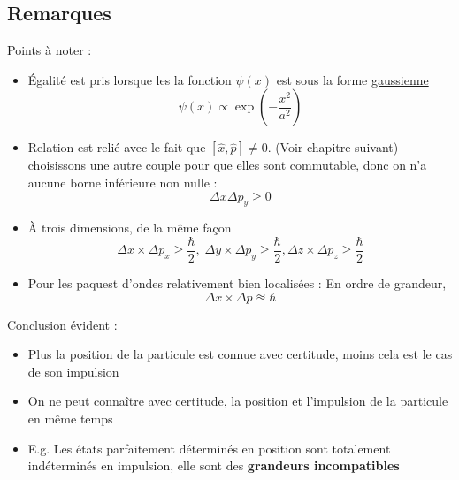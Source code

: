 \subsection{Remarques} %
\label{sub:Remarques}

Points à noter :
\begin{itemize}
\item Égalité est pris lorsque les la fonction $\psi(x)$ est sous la forme \underline{gaussienne}
  \begin{equation}
    \psi(x) \propto \exp \left( - \frac{x ^{2}}{a ^{2}}  \right)
  \end{equation}
    \item Relation est relié avec le fait que $[\hat{x}, \hat{p}] \ne 0$. (Voir chapitre suivant) choisissons une autre couple pour que elles sont commutable, donc on n'a aucune borne inférieure non nulle :
      \begin{equation}
        \Delta x \Delta p_y \ge 0
      \end{equation}

    \item À trois dimensions, de la même façon 
      \begin{equation}
        \boxed{ \Delta x \times \Delta p_x \ge \frac{\hbar}{2}, \; \Delta y \times \Delta p_y \ge \frac{\hbar}{2} , \Delta z \times \Delta p_z \ge \frac{\hbar}{2} }
      \end{equation}

    \item Pour les paquest d'ondes relativement bien localisées : En ordre de grandeur, 
      \begin{equation}
        \Delta x \times \Delta p \approxeq \hbar
      \end{equation}

\end{itemize}

Conclusion évident : 
\begin{itemize}

    \item Plus la position de la particule est connue avec certitude, moins cela est le cas de son impulsion 
    \item On ne peut connaître avec certitude, la position et l'impulsion de la particule en même temps 
    \item E.g. Les états parfaitement déterminés en position sont totalement indéterminés en impulsion, elle sont des \textbf{grandeurs incompatibles}

\end{itemize}

